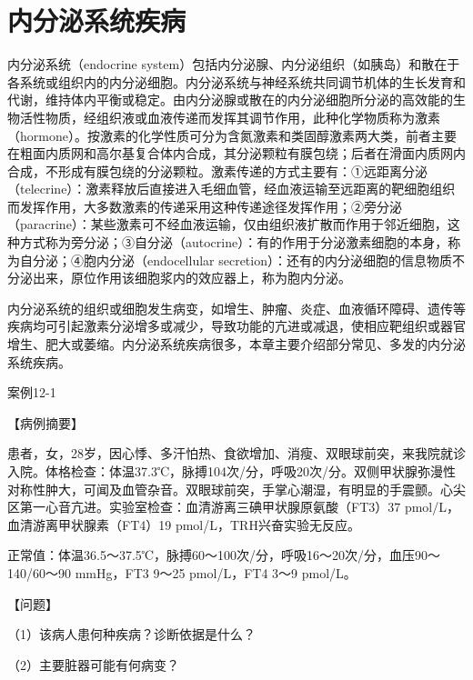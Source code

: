\chapter{内分泌系统疾病}


内分泌系统（endocrine
system）包括内分泌腺、内分泌组织（如胰岛）和散在于各系统或组织内的内分泌细胞。内分泌系统与神经系统共同调节机体的生长发育和代谢，维持体内平衡或稳定。由内分泌腺或散在的内分泌细胞所分泌的高效能的生物活性物质，经组织液或血液传递而发挥其调节作用，此种化学物质称为激素（hormone）。按激素的化学性质可分为含氮激素和类固醇激素两大类，前者主要在粗面内质网和高尔基复合体内合成，其分泌颗粒有膜包绕；后者在滑面内质网内合成，不形成有膜包绕的分泌颗粒。激素传递的方式主要有：①远距离分泌（telecrine）：激素释放后直接进入毛细血管，经血液运输至远距离的靶细胞组织而发挥作用，大多数激素的传递采用这种传递途径发挥作用；②旁分泌（paracrine）：某些激素可不经血液运输，仅由组织液扩散而作用于邻近细胞，这种方式称为旁分泌；③自分泌（autocrine）：有的作用于分泌激素细胞的本身，称为自分泌；④胞内分泌（endocellular
secretion）：还有的内分泌细胞的信息物质不分泌出来，原位作用该细胞浆内的效应器上，称为胞内分泌。

内分泌系统的组织或细胞发生病变，如增生、肿瘤、炎症、血液循环障碍、遗传等疾病均可引起激素分泌增多或减少，导致功能的亢进或减退，使相应靶组织或器官增生、肥大或萎缩。内分泌系统疾病很多，本章主要介绍部分常见、多发的内分泌系统疾病。

\begin{framed}
{案例12-1}

{【病例摘要】}

患者，女，28岁，因心悸、多汗怕热、食欲增加、消瘦、双眼球前突，来我院就诊入院。体格检查：体温37.3℃，脉搏104次/分，呼吸20次/分。双侧甲状腺弥漫性对称性肿大，可闻及血管杂音。双眼球前突，手掌心潮湿，有明显的手震颤。心尖区第一心音亢进。实验室检查：血清游离三碘甲状腺原氨酸（FT3）37
pmol/L，血清游离甲状腺素（FT4）19 pmol/L，TRH兴奋实验无反应。

正常值：体温36.5～37.5℃，脉搏60～100次/分，呼吸16～20次/分，血压90～140/60～90
mmHg，FT3 9～25 pmol/L，FT4 3～9 pmol/L。

{【问题】}

（1）该病人患何种疾病？诊断依据是什么？

（2）主要脏器可能有何病变？
\end{framed}

